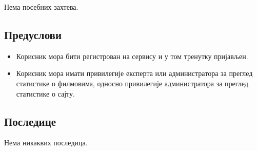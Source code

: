 Нема посебних захтева.

\subsection{Предуслови}

\begin{itemize}
    \item Корисник мора бити регистрован на сервису и у том тренутку пријављен.
    \item Корисник мора имати привилегије експерта или администратора за преглед статистике о филмовима,
      односно привилегије администратора за преглед статистике о сајту.
\end{itemize}

\subsection{Последице}

Нема никаквих последица.
